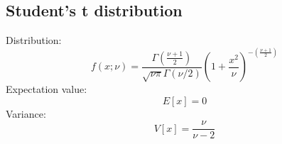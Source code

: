 \documentclass[12pt]{book}
\begin{document}
\subsection{Student's t distribution}
Distribution:
\begin{equation}
	f(x;\nu) = \frac{\Gamma\left(\frac{\nu+1}{2}\right)}{\sqrt{\nu\pi}\Gamma(\nu/2)}\left(1+ \frac{x^2}{\nu}\right)^{-\left(\frac{\nu+1}{2}\right)}
\end{equation}
Expectation value:
\begin{equation}
	E[x] = 0
\end{equation}
Variance:
\begin{equation}
	V[x] = \frac{\nu}{\nu-2}
\end{equation}
\end{document}
